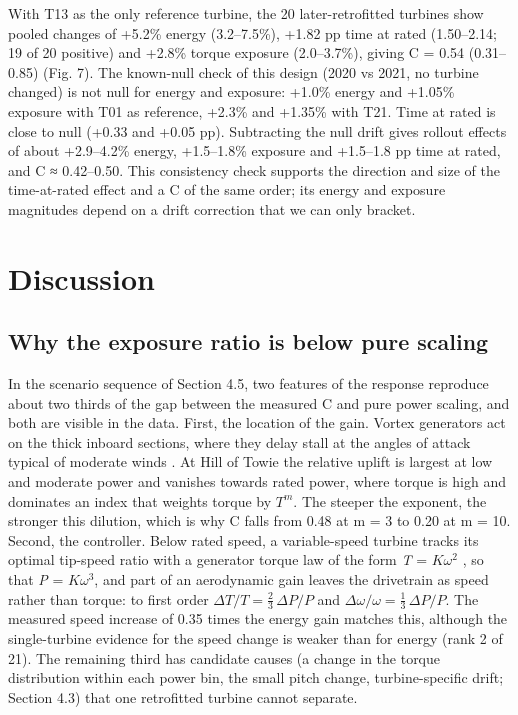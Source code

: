 \documentclass[preprint,12pt]{elsarticle}
\begin{document}
With T13 as the only reference turbine, the 20 later-retrofitted turbines show pooled changes of +5.2\% energy (3.2--7.5\%), +1.82 pp time at rated (1.50--2.14; 19 of 20 positive) and +2.8\% torque exposure (2.0--3.7\%), giving C = 0.54 (0.31--0.85) (Fig. 7). The known-null check of this design (2020 vs 2021, no turbine changed) is not null for energy and exposure: +1.0\% energy and +1.05\% exposure with T01 as reference, +2.3\% and +1.35\% with T21. Time at rated is close to null (+0.33 and +0.05 pp). Subtracting the null drift gives rollout effects of about +2.9--4.2\% energy, +1.5--1.8\% exposure and +1.5--1.8 pp time at rated, and C ≈ 0.42--0.50. This consistency check supports the direction and size of the time-at-rated effect and a C of the same order; its energy and exposure magnitudes depend on a drift correction that we can only bracket.

\section{Discussion}

\subsection{Why the exposure ratio is below pure scaling}

In the scenario sequence of Section 4.5, two features of the response reproduce about two thirds of the gap between the measured C and pure power scaling, and both are visible in the data. First, the location of the gain. Vortex generators act on the thick inboard sections, where they delay stall at the angles of attack typical of moderate winds \cite{zhao,moon}. At Hill of Towie the relative uplift is largest at low and moderate power and vanishes towards rated power, where torque is high and dominates an index that weights torque by \(T^m\). The steeper the exponent, the stronger this dilution, which is why C falls from 0.48 at m = 3 to 0.20 at m = 10. Second, the controller. Below rated speed, a variable-speed turbine tracks its optimal tip-speed ratio with a generator torque law of the form \emph{T} = \(K\omega^2\) \cite{bossanyi00,johnson06,burton11}, so that \emph{P} = \(K\omega^3\), and part of an aerodynamic gain leaves the drivetrain as speed rather than torque: to first order \(\Delta T/T = \tfrac{2}{3}\,\Delta P/P\) and \(\Delta\omega/\omega = \tfrac{1}{3}\,\Delta P/P\). The measured speed increase of 0.35 times the energy gain matches this, although the single-turbine evidence for the speed change is weaker than for energy (rank 2 of 21). The remaining third has candidate causes (a change in the torque distribution within each power bin, the small pitch change, turbine-specific drift; Section 4.3) that one retrofitted turbine cannot separate.
\end{document}
